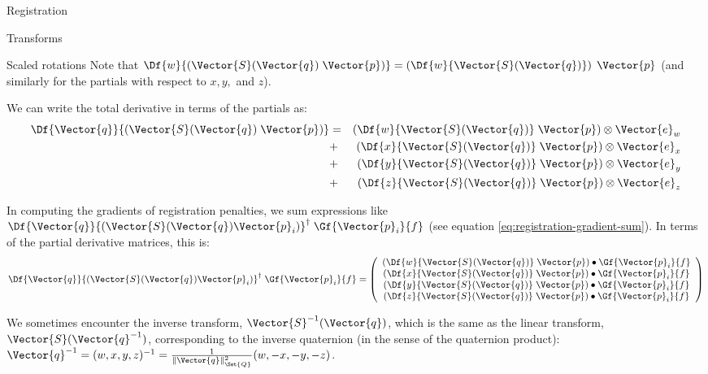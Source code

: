 \begin{plSection}{Registration}
\begin{plSection}{Transforms}
\begin{plSection}{Scaled rotations}
Note that
$\Df{w}{\left( \Vector{S}(\Vector{q}) \; \Vector{p} \right)}
 = \left( \Df{w}{\Vector{S}(\Vector{q})}\right) \; \Vector{p}$
(and similarly for the partials with respect to $x,y,$ and $z$).

We can write the total derivative in terms of the partials as:
\begin{eqnarray}
\Df{\Vector{q}}{\left( \Vector{S}(\Vector{q}) \; \Vector{p} \right)}
& = &
\left( \Df{w}{\Vector{S}(\Vector{q})} \; \Vector{p} \right) \otimes \Vector{e}_w
\\
& + &
\left( \Df{x}{\Vector{S}(\Vector{q})} \; \Vector{p} \right) \otimes \Vector{e}_x
\nonumber
\\
& + &
\left( \Df{y}{\Vector{S}(\Vector{q})} \; \Vector{p} \right) \otimes \Vector{e}_y
\nonumber
\\
& + &
\left( \Df{z}{\Vector{S}(\Vector{q})} \; \Vector{p} \right) \otimes \Vector{e}_z
\nonumber
\end{eqnarray}

In computing the gradients of registration penalties,
we sum expressions like
$\Df{\Vector{q}}{\left( \Vector{S}(\Vector{q})\Vector{p}_i \right)}^{\dagger} \;
\Gf{\Vector{p}_i}{f}$
(see equation \ref{eq:registration-gradient-sum}).
In terms of the partial derivative matrices,
this is:
\begin{equation}
\Df{\Vector{q}}{\left( \Vector{S}(\Vector{q})\Vector{p}_i \right)}^{\dagger} \;
\Gf{\Vector{p}_i}{f}
=
\left(
\begin{array}{c}
\left( \Df{w}{\Vector{S}(\Vector{q})} \; \Vector{p} \right) \bullet \Gf{\Vector{p}_i}{f} \\
\left( \Df{x}{\Vector{S}(\Vector{q})} \; \Vector{p} \right) \bullet \Gf{\Vector{p}_i}{f} \\
\left( \Df{y}{\Vector{S}(\Vector{q})} \; \Vector{p} \right) \bullet \Gf{\Vector{p}_i}{f} \\
\left( \Df{z}{\Vector{S}(\Vector{q})} \; \Vector{p} \right) \bullet \Gf{\Vector{p}_i}{f} \\
\end{array}
\right)
\end{equation}

We sometimes encounter the inverse transform, $\Vector{S}^{-1}(\Vector{q})$,
which is the same as the linear transform,
$\Vector{S}(\Vector{q}^{-1})$,
corresponding to the inverse quaternion
(in the sense of the quaternion product):
$\Vector{q}^{-1} = (w, x, y, z)^{-1}
         = {1 \over {\| \Vector{q} \|_{\Set{Q}}^2}} (w, -x, -y, -z)$.


\end{plSection}
\end{plSection}
\end{plSection}

